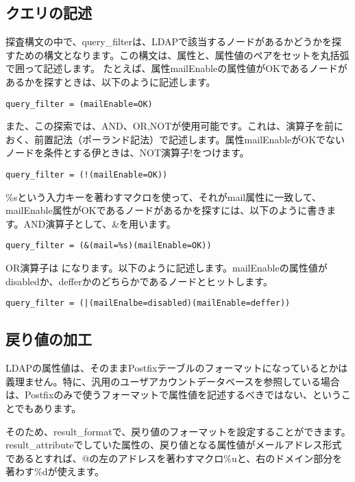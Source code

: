 \subsection{クエリの記述}

探査構文の中で、query\_filterは、LDAPで該当するノードがあるかどうかを探すための構文となります。この構文は、属性と、属性値のペアをセットを丸括弧で囲って記述します。
たとえば、属性mailEnableの属性値がOKであるノードがあるかを探すときは、以下のように記述します。

\begin{verbatim}
query_filter = (mailEnable=OK)
\end{verbatim}

また、この探索では、AND、OR,NOTが使用可能です。これは、演算子を前におく、前置記法（ポーランド記法）で記述します。属性mailEnableがOKでないノードを条件とする伊ときは、NOT演算子!をつけます。

\begin{verbatim}
query_filter = (!(mailEnable=OK))
\end{verbatim}

\%sという入力キーを著わすマクロを使って、それがmail属性に一致して、mailEnable属性がOKであるノードがあるかを探すには、以下のように書きます。AND演算子として、\&を用います。

\begin{verbatim}
query_filter = (&(mail=%s)(mailEnable=OK))
\end{verbatim}

OR演算子は
\textbar
になります。以下のように記述します。mailEnableの属性値がdisabledか、defferかのどちらかであるノードとヒットします。

\begin{verbatim}
query_filter = (|(mailEnalbe=disabled)(mailEnable=deffer))
\end{verbatim}



\subsection{戻り値の加工}

LDAPの属性値は、そのままPostfixテーブルのフォーマットになっているとかは義理ません。特に、汎用のユーザアカウントデータベースを参照している場合は、Postfixのみで使うフォーマットで属性値を記述するべきではない、ということでもあります。

そのため、result\_formatで、戻り値のフォーマットを設定することができます。result\_attributeでしていた属性の、戻り値となる属性値がメールアドレス形式であるとすれば、@の左のアドレスを著わすマクロ\%uと、右のドメイン部分を著わす\%dが使えます。

